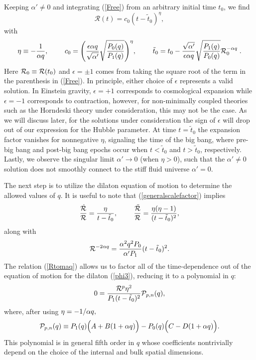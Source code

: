 \documentclass[amsmath,amssymb,11pt]{article}
\begin{document}
Keeping $\alpha'\neq0$ and integrating (\ref{Free}) from an arbitrary initial time $t_0$, we find
\begin{equation}\label{generalscalefactor}
\mathcal{R}(t)=c_0(t-\tilde{t}_0)^{\eta},
\end{equation}
with 
\begin{equation}\label{c0t0}
\eta\equiv -\frac{1}{\alpha q}, \ \ \ \ \ \ \ 
c_0 = \Bigg(\frac{\epsilon\alpha q}{\sqrt{\alpha'}}\sqrt{\frac{P_0(q)}{P_1(q)}}\Bigg)^{\eta}, \ \ \ \ \ \ \ \tilde{t}_0 = t_0-\frac{\sqrt{\alpha'}}{\epsilon\alpha q}\sqrt{\frac{P_1(q)}{P_0(q)}}\mR_0^{-\alpha q}\;.
\end{equation}
Here $\mathcal{R}_0\equiv \mathcal{R}(t_0)$ and $\epsilon=\pm1$ comes from taking the square root of the term in the parenthesis in (\ref{Free}). In principle, either choice of $\epsilon$ represents a valid solution. In Einstein gravity, $\epsilon=+1$ corresponds to cosmological expansion while $\epsilon=-1$ corresponds to contraction, however, for non-minimally coupled theories such as the Horndeski theory under consideration, this may not be the case. As we will discuss later, for the solutions under consideration the sign of $\epsilon$ will drop out of our expression for the Hubble parameter.  At time $t=\tilde{t}_{0}$ the expansion factor vanishes for nonnegative $\eta$, signaling the time of the big bang, where pre-big bang and post-big bang epochs occur when $t<\tilde{t}_{0}$ and $t>\tilde{t}_{0}$, respectively. Lastly, we observe the singular limit $\alpha'\to0$ (when $\eta>0$), such that the $\alpha'\neq0$ solution does not smoothly connect to the stiff fluid universe $\alpha'=0$. 




The next step is to utilize the dilaton equation of motion to determine the allowed values of $q$. It is useful to note that (\ref{generalscalefactor}) implies
\begin{equation}
\frac{\mRd}{\mR}=\frac{\eta}{t-\tilde{t}_0}, \ \ \ \ \ \ \ \frac{\mRdd}{\mR}=\frac{\eta(\eta-1)}{(t-\tilde{t}_0)^2},
\end{equation}
along with 
\begin{equation}\label{Rtomaq}
\mathcal{R}^{-2\alpha q}=\frac{\alpha^2 q^2 P_0}{\alpha' P_1}(t-\tilde{t}_0)^2.
\end{equation}
The relation (\ref{Rtomaq}) allows us to factor all of the time-dependence out of the equation of motion for the dilaton (\ref{phi3}), reducing it to a polynomial in $q$:
\begin{equation}
0=\frac{\mathcal{R}^p\eta^2}{P_1(t-\tilde{t}_0)^2}\mathcal{P}_{p,n}(q),
\end{equation}
where, after using $\eta=-1/\alpha q,$ 
\begin{equation}\label{EinsteinPee}
\mathcal{P}_{p,n}(q)\equiv P_1(q)\Big(A+B(1+\alpha q)\Big)-P_0(q)\Big(C-D(1+\alpha q)\Big). 
\end{equation}
This polynomial is in general fifth order in $q$ whose coefficients nontrivially depend on the choice of the internal and bulk spatial dimensions. 
\end{document}
